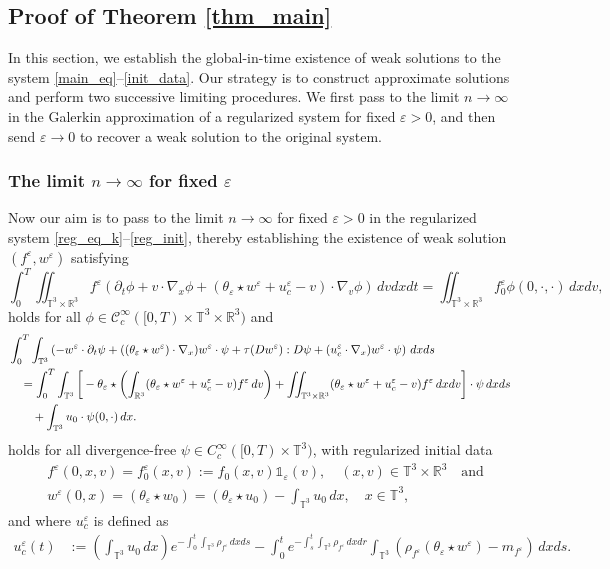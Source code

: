 \documentclass[10pt,reqno]{amsart}
\numberwithin{equation}{section}
\newcommand{\R}{\mathbb R}
\newcommand{\T}{\mathbb T}
\newcommand{\bq}{\begin{equation}}
\newcommand{\eq}{\end{equation}}
\newcommand{\e}{\varepsilon}
\newcommand{\lt}{\left}
\newcommand{\rt}{\right}
\newcommand{\pa}{\partial}
\newcommand{\intt}{\int_{\T^3}}
\newcommand{\inttr}{\iint_{\T^3 \times \R^3}}
\begin{document}
%
%
% 
%
%
\subsection{Proof of Theorem \ref{thm_main}} In this section, we establish the global-in-time existence of weak solutions to the system \eqref{main_eq}--\eqref{init_data}. Our strategy is to construct approximate solutions and perform two successive limiting procedures. We first pass to the limit $n \to \infty$ in the Galerkin approximation of a regularized system for fixed $\e > 0$, and then send $\e \to 0$ to recover a weak solution to the original system.
%
%
% 
%
%
\subsubsection{The limit $n \to \infty$ for fixed $\e$}

Now our aim is to pass to the limit $n \to \infty$ for fixed $\e > 0$ in the regularized system \eqref{reg_eq_k}--\eqref{reg_init},  thereby establishing the existence of weak solution $(f^\e, w^\e)$ satisfying
\bq\label{reg_eq_e_k}
\int_0^T \!\!\inttr f^{\e}(\pa_t \phi + v \cdot \nabla_x \phi + (\theta_\e\star w^{\e}+u_c^{\e}-v )\cdot \nabla_v  \phi)\,dvdxdt = \inttr f^\e_0 \phi(0,\cdot,\cdot)\,dxdv,
\eq
holds for all $\phi \in \mathcal{C}_c^\infty([0,T)\times \T^3 \times \R^3)$ and 
\begin{align*}%
&\int_0^T \intt \left(-w^\e \cdot \pa_t \psi + ((\theta_\e \star w^{\e}) \cdot \nabla_x) w^\e \cdot \psi
+ \tau(Dw^\e): D \psi + ( u_c^\e \cdot \nabla_x ) w^\e \cdot  \psi \right)\,dxds \\
&\quad =  \int_0^T \intt \bigg[ -\theta_\e \star \lt(\int_{\R^3} (\theta_\e \star w^\e +u_c^\e-v)f^\e\,dv\rt) + \inttr(\theta_\e\star w^\e+u_c^\e-v)f^\e\,dxdv\bigg]\cdot \psi\,dxds  \cr
&\qquad +  \intt u_0 \cdot \psi(0,\cdot)\,dx.
\end{align*} 
holds for all divergence-free $\psi \in C_c^\infty([0,T)\times\T^3)$, with regularized initial data
\bq\label{reg_init_e}
\begin{aligned}
&f^\e(0,x,v)= f_0^\e(x,v) := f_0(x,v)\mathds{1}_\e (v), \quad (x,v) \in \T^3 \times \R^3 \quad \mbox{and} \\
&w^\e(0,x)= (\theta_\e \star w_0) = (\theta_\e\star u_0) - \intt u_0\,dx,  \quad x \in \T^3,
\end{aligned}
\eq
and where $u_c^\e$ is defined as
\[\begin{aligned}
u_c^\e(t)&:= \lt(\intt u_0\,dx\rt)e^{-\int_0^t \intt \rho_{f^\e}\,dxds }  - \int_0^t e^{-\int_s^t \intt \rho_{f^\e}\,dxdr }\intt (\rho_{f^\e} (\theta_\e\star  w^\e) - m_{f^\e})\,dxds. \quad 
\end{aligned}\]
\end{document}
